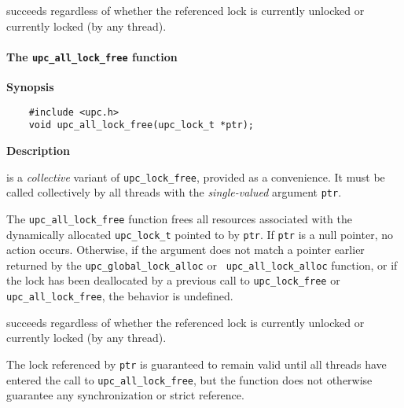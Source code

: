  succeeds regardless of whether the
    referenced lock is currently unlocked or currently locked (by any
    thread).

\np %

\cbstart
\paragraph{The {\tt upc\_all\_lock\_free} function}

{\bf Synopsis}

\npf\vspace{-2.5em}
\begin{verbatim}
    #include <upc.h> 
    void upc_all_lock_free(upc_lock_t *ptr); 
\end{verbatim}

{\bf Description}

 is a {\em collective} variant of {\tt upc\_lock\_free}, provided as a convenience.
    It must be called collectively by all threads with the {\em single-valued} argument {\tt ptr}.

\np The {\tt upc\_all\_lock\_free} function frees all resources
    associated with the dynamically allocated {\tt upc\_lock\_t} pointed to
    by {\tt ptr}.  If {\tt ptr} is a null pointer, no action occurs.
    Otherwise, if the argument does not match a pointer earlier
    returned by the {\tt upc\_global\_lock\_alloc} or {\tt
    upc\_all\_lock\_alloc} function, or if the lock has been
    deallocated by a previous call to {\tt upc\_lock\_free}
    or {\tt upc\_all\_lock\_free}, the behavior is undefined.

 succeeds regardless of whether the
    referenced lock is currently unlocked or currently locked (by any
    thread).

\np The lock referenced by {\tt ptr} is guaranteed to remain valid
    until all threads have entered the call to {\tt upc\_all\_lock\_free}, but the
    function does not otherwise guarantee any synchronization or strict reference.

